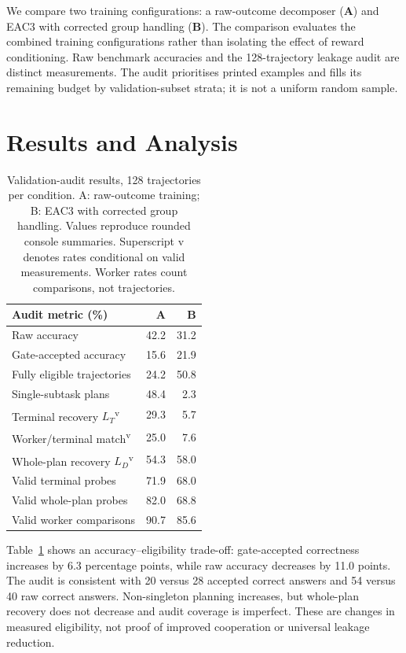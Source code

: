 \documentclass[11pt]{article}
\begin{document}
We compare two training configurations: a raw-outcome decomposer (\textbf{A}) and EAC3 with corrected group handling (\textbf{B}). The comparison evaluates the combined training configurations rather than isolating the effect of reward conditioning. Raw benchmark accuracies and the 128-trajectory leakage audit are distinct measurements. The audit prioritises printed examples and fills its remaining budget by validation-subset strata; it is not a uniform random sample.

\section{Results and Analysis}
\begin{table}[t]
\centering
\small
\begin{tabular}{@{}lrr@{}}
\toprule
Audit metric (\%) & A & B\\
\midrule
Raw accuracy & 42.2 & 31.2\\
Gate-accepted accuracy & 15.6 & 21.9\\
Fully eligible trajectories & 24.2 & 50.8\\
Single-subtask plans & 48.4 & 2.3\\
Terminal recovery $L_T$\textsuperscript{v} & 29.3 & 5.7\\
Worker/terminal match\textsuperscript{v} & 25.0 & 7.6\\
Whole-plan recovery $L_D$\textsuperscript{v} & 54.3 & 58.0\\
\midrule
Valid terminal probes & 71.9 & 68.0\\
Valid whole-plan probes & 82.0 & 68.8\\
Valid worker comparisons & 90.7 & 85.6\\
\bottomrule
\end{tabular}
\caption{Validation-audit results, 128 trajectories per condition. A: raw-outcome training; B: EAC3 with corrected group handling. Values reproduce rounded console summaries. Superscript v denotes rates conditional on valid measurements. Worker rates count comparisons, not trajectories.}
\label{tab:results}
\end{table}

Table~\ref{tab:results} shows an accuracy--eligibility trade-off: gate-accepted correctness increases by 6.3 percentage points, while raw accuracy decreases by 11.0 points. The audit is consistent with 20 versus 28 accepted correct answers and 54 versus 40 raw correct answers. Non-singleton planning increases, but whole-plan recovery does not decrease and audit coverage is imperfect. These are changes in measured eligibility, not proof of improved cooperation or universal leakage reduction.
\end{document}
